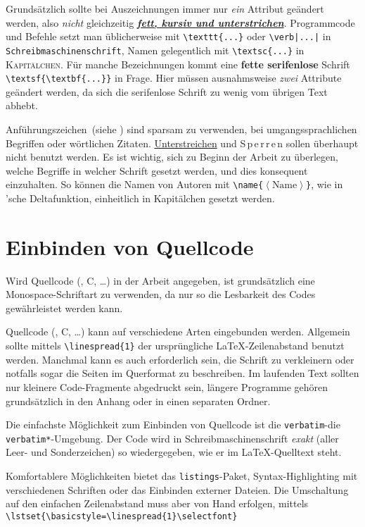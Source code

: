Grundsätzlich sollte bei Auszeichnungen immer nur \emph{ein} Attribut geändert werden, also \emph{nicht} gleichzeitig \emph{\underline{\textbf{fett, kursiv und
unterstrichen}}}.
Programmcode und Befehle setzt man üblicherweise mit \verb|\texttt{...}| oder \verb+\verb|...|+ in \texttt{Schreibmaschinenschrift}, Namen gelegentlich mit \verb|\textsc{...}| in \textsc{Kapitälchen}.
Für manche Bezeichnungen kommt eine \textsf{\textbf{fette serifenlose}} Schrift \verb|\textsf{\textbf{...}}| in Frage.
Hier müssen ausnahmsweise \emph{zwei} Attribute geändert werden, da sich die \textsf{serifenlose} Schrift zu wenig vom übrigen Text abhebt.

\glqq Anführungszeichen\grqq\ (siehe ) sind sparsam zu verwenden, \zB bei umgangssprachlichen Begriffen oder wörtlichen Zitaten.
\underline{Unterstreichen} und \mbox{S\,p\,e\,r\,r\,e\,n} sollen überhaupt nicht benutzt werden.
Es ist wichtig, sich zu Beginn der Arbeit zu überlegen, welche Begriffe in welcher Schrift gesetzt werden, und dies konsequent einzuhalten.
So können \bspw die Namen von Autoren mit \texttt{\textbackslash{}name\{$\left\langle\text{Name}\right\rangle$\}}, wie in 'sche Deltafunktion, einheitlich in Kapitälchen gesetzt werden.


\section{Einbinden von Quellcode}
Wird Quellcode (\Matlab{}, C, \ldots) in der Arbeit angegeben, ist grundsätzlich eine Monospace-Schriftart zu verwenden, da nur so die Lesbarkeit des Codes
gewährleistet werden kann.

Quellcode (\Matlab{}, C, \ldots) kann auf verschiedene Arten eingebunden werden.
Allgemein sollte mittels \verb|\linespread{1}| der ursprüngliche \LaTeX-Zeilenabstand benutzt werden.
Manchmal kann es auch erforderlich sein, die Schrift zu verkleinern oder notfalls sogar die Seiten im Querformat zu beschreiben.
Im laufenden Text sollten nur kleinere Code-Fragmente abgedruckt sein, längere Programme gehören grundsätzlich in den Anhang oder in einen separaten Ordner.

Die einfachste Möglichkeit zum Einbinden von Quellcode ist die \verb|verbatim|-\bzw die \verb|verbatim*|-Umgebung.
Der Code wird in Schreibmaschinenschrift \emph{exakt} (\inkl aller Leer- und Sonderzeichen) so wiedergegeben, wie er im \LaTeX-Quelltext steht.

Komfortablere Möglichkeiten bietet das \verb|listings|-Paket, \zB Syntax-Highlighting mit verschiedenen Schriften oder das Einbinden externer Dateien.
Die Umschaltung auf den einfachen Zeilenabstand muss aber von Hand erfolgen, \zB mittels\\[\parskip]
\hspace*{2em}\verb|\lstset{\basicstyle=\linespread{1}\selectfont}|


